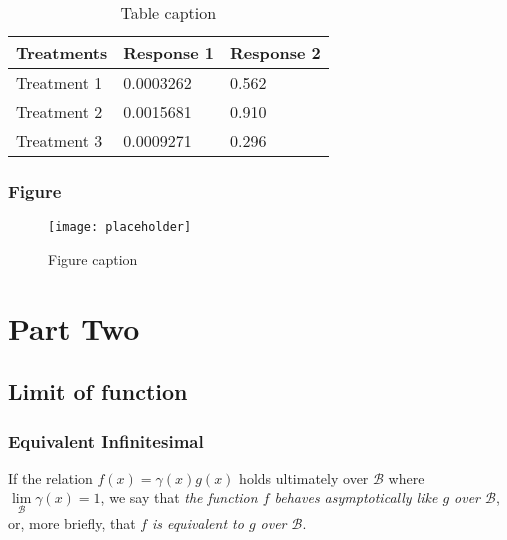 \documentclass[11pt,fleqn]{book} %
\begin{document}
\begin{table}[h]
\centering
\begin{tabular}{l l l}
\toprule
\textbf{Treatments} & \textbf{Response 1} & \textbf{Response 2}\\
\midrule
Treatment 1 & 0.0003262 & 0.562 \\
Treatment 2 & 0.0015681 & 0.910 \\
Treatment 3 & 0.0009271 & 0.296 \\
\bottomrule
\end{tabular}
\caption{Table caption}
\end{table}


\section{Figure}

\begin{figure}[h]
\centering\texttt{[image: placeholder]}
\caption{Figure caption}
\end{figure}





\part{Part Two}






\chapter{Limit of function}

\section{Equivalent Infinitesimal}

\begin{definition}
If the relation $f(x)=\gamma(x)g(x)$ holds ultimately over $\mathcal{B}$ where $\lim\limits_{\mathcal{B}}{\gamma(x)}=1$, we say that \emph{the function $f$ behaves asymptotically like $g$ over $\mathcal{B}$}, or, more briefly, that $f$ \emph{is equivalent to $g$ over $\mathcal{B}$}.



\end{definition}
\end{document}
